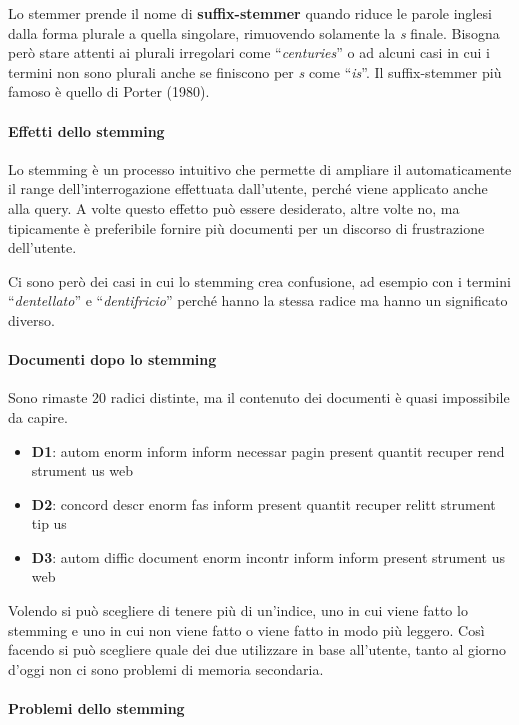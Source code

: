 Lo stemmer prende il nome di \textbf{suffix-stemmer} quando riduce le parole inglesi dalla forma plurale a quella singolare, rimuovendo solamente la \textit{s} finale. Bisogna però stare attenti ai plurali irregolari come ``\textit{centuries}'' o ad alcuni casi in cui i termini non sono plurali anche se finiscono per \textit{s} come ``\textit{is}''. Il suffix-stemmer più famoso è quello di Porter (1980).

\paragraph{Effetti dello stemming}

Lo stemming è un processo intuitivo che permette di ampliare il automaticamente il range dell'interrogazione effettuata dall'utente, perché viene applicato anche alla query. A volte questo effetto può essere desiderato, altre volte no, ma tipicamente è preferibile fornire più documenti per un discorso di frustrazione dell'utente.

Ci sono però dei casi in cui lo stemming crea confusione, ad esempio con i termini ``\textit{dentellato}'' e ``\textit{dentifricio}'' perché hanno la stessa radice ma hanno un significato diverso.

\paragraph{Documenti dopo lo stemming}
Sono rimaste 20 radici distinte, ma il contenuto dei documenti è quasi impossibile da capire.

\begin{itemize}
	\item \textbf{D1}: autom enorm inform inform necessar pagin present quantit recuper rend strument us web
	\item \textbf{D2}: concord descr enorm fas inform present quantit recuper relitt strument tip us
	\item \textbf{D3}: autom diffic document enorm incontr inform inform present strument us web
\end{itemize}

Volendo si può scegliere di tenere più di un'indice, uno in cui viene fatto lo stemming e uno in cui non viene fatto o viene fatto in modo più leggero. Così facendo si può scegliere quale dei due utilizzare in base all'utente, tanto al giorno d'oggi non ci sono problemi di memoria secondaria.

\paragraph{Problemi dello stemming}

